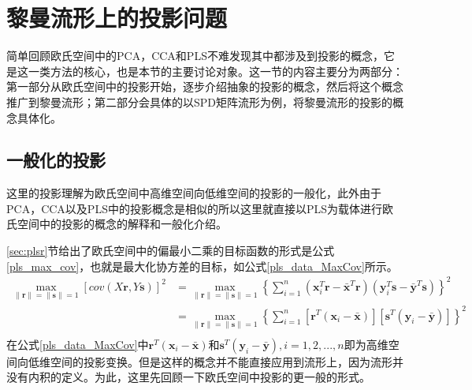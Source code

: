 \section{黎曼流形上的投影问题}
\label{sec:manifold_projection}
简单回顾欧氏空间中的PCA，CCA和PLS不难发现其中都涉及到投影的概念，它是这一类方法的核心，也是本节的主要讨论对象。这一节的内容主要分为两部分：第一部分从欧氏空间中的投影开始，逐步介绍抽象的投影的概念，然后将这个概念推广到黎曼流形；第二部分会具体的以SPD矩阵流形为例，将黎曼流形的投影的概念具体化。
\subsection{一般化的投影}
\label{sec:common_projection}
这里的投影理解为欧氏空间中高维空间向低维空间的投影的一般化，此外由于PCA，CCA以及PLS中的投影概念是相似的所以这里就直接以PLS为载体进行欧氏空间中的投影的概念的解释和一般化介绍。

\ref{sec:plsr}节给出了欧氏空间中的偏最小二乘的目标函数的形式是公式\ref{pls_max_cov}，也就是最大化协方差的目标，如公式\ref{pls_data_MaxCov}所示。
\begin{equation}
\label{pls_data_MaxCov}
\begin{split}
\max_{\|\bm{r}\|=\|\bm{s}\|=1}[cov(X\bm{r},Y\bm{s})]^{2}&=\max_{\|\bm{r}\|=\|\bm{s}\|=1}\left\{\sum_{i=1}^{n}(\bm{x}_{i}^{T}\bm{r}-\bar{\bm{x}}^{T}\bm{r})(\bm{y}_{i}^{T}\bm{s}-\bar{\bm{y}}^{T}\bm{s})\right\}^2\\
&=\max_{\|\bm{r}\|=\|\bm{s}\|=1}\left\{\sum_{i=1}^{n}[\bm{r}^{T}(\bm{x}_{i}-\bar{\bm{x}})][\bm{s}^{T}(\bm{y}_{i}-\bar{\bm{y}})]\right\}^2\\
\end{split}
\end{equation}
在公式\ref{pls_data_MaxCov}中$\bm{r}^{T}(\bm{x}_{i}-\bar{\bm{x}})$和$\bm{s}^{T}(\bm{y}_{i}-\bar{\bm{y}}),i=1,2,...,n$即为高维空间向低维空间的投影变换。但是这样的概念并不能直接应用到流形上，因为流形并没有内积的定义。为此，这里先回顾一下欧氏空间中投影的更一般的形式。


